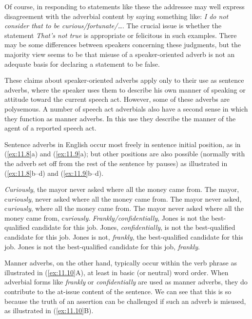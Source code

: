 Of course, in responding to statements like these the addressee may well express disagreement with the adverbial content by saying something like: \textit{I do not consider that to be curious/fortunate/…}. The crucial issue is whether the statement \textit{That’s not true} is appropriate or felicitous in such examples. There may be some differences between speakers concerning these judgments, but the majority view seems to be that misuse of a speaker-oriented adverb is not an adequate basis for declaring a statement to be false.


These claims about speaker-oriented adverbs apply only to their use as sentence adverbs, where the speaker uses them to describe his own manner of speaking or attitude toward the current speech act. However, some of these adverbs are polysemous. A number of speech act adverbials also have a second sense in which they function as manner adverbs. In this use they describe the manner of the agent of a reported speech act.


Sentence adverbs in English occur most freely in sentence initial position, as in (\ref{ex:11.8}a) and (\ref{ex:11.9}a); but other positions are also possible (normally with the adverb set off from the rest of the sentence by pauses) as illustrated in (\ref{ex:11.8}b--d) and (\ref{ex:11.9}b--d).


\ea \label{ex:11.8}
\ea \textit{Curiously}, the mayor never asked where all the money came from.
\ex The mayor, c\textit{uriously}, never asked where all the money came from.
\ex The mayor never asked, c\textit{uriously}, where all the money came from.
\ex The mayor never asked where all the money came from, c\textit{uriously}.
       \z
\ex \label{ex:11.9}
\ea \textit{Frankly/confidentially}, Jones is not the best-qualified candidate for this job.
\ex Jones, \textit{confidentially}, is not the best-qualified candidate for this job.
\ex Jones is not, \textit{frankly}, the best-qualified candidate for this job.
\ex Jones is not the best-qualified candidate for this job, \textit{frankly}.
                       \z
\z

Manner adverbs, on the other hand, typically occur within the verb phrase as illustrated in (\ref{ex:11.10}A), at least in basic (or neutral) word order. When adverbial forms like \textit{frankly} or \textit{confidentially} are used as manner adverbs, they do contribute to the at-issue content of the sentence. We can see that this is so because the truth of an assertion can be challenged if such an adverb is misused, as illustrated in (\ref{ex:11.10}B).



